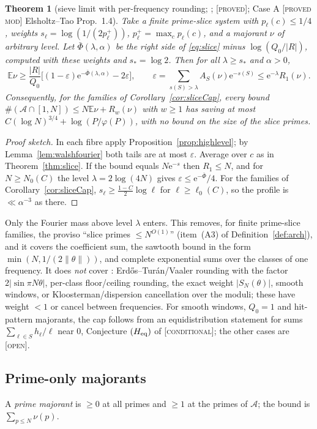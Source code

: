 \documentclass[10pt,reqno]{amsart}
\newtheorem{theorem}{Theorem}[section]
\theoremstyle{definition}
\theoremstyle{remark}
\newcommand{\A}{\mathcal A}
\newcommand{\E}{\mathbb E}
\newcommand{\e}{\mathrm e}
\newcommand{\lab}[1]{\textup{[\textsc{#1}]}}
\begin{document}
\begin{theorem}[sieve limit with per-frequency rounding; {\cite[Thm~2.3, Cors~2.4, 2.5]{NC}}; \lab{proved}; Case A \lab{proved mod} Elsholtz--Tao Prop.~1.4]\label{thm:perfreq}
Take a finite prime-slice system with $p_\ell(c)\leq1/4$, weights
$s_\ell=\log(1/(2p^+_\ell))$, $p^+_\ell=\max_cp_\ell(c)$, and a majorant $\nu$ of
arbitrary level.  Let $\bar\Phi(\lambda,\alpha)$ be the right side of
\eqref{eq:slice} minus $\log(Q_0/|R|)$, computed with these weights and
$s_*=\log2$.  Then for all $\lambda\geq s_*$ and $\alpha>0$,
\[
 \E\nu\geq\frac{|R|}{Q_0}\bigl[(1-\varepsilon)\e^{-\bar\Phi(\lambda,\alpha)}-2\varepsilon\bigr],\qquad
 \varepsilon=\sum_{s(S)>\lambda}A_S(\nu)\e^{-s(S)}\leq\e^{-\lambda}R_1(\nu).
\]
Consequently, for the families of Corollary~\ref{cor:sliceCap}, every
bound $\#(\A\cap[1,N])\leq N\E\nu+R_w(\nu)$ with $w\geq1$ has saving at most
$C(\log N)^{3/4}+\log(P/\varphi(P))$, with no bound on the size of the
slice primes.
\end{theorem}
\begin{proof}[Proof sketch]
In each fibre apply Proposition~\ref{prop:highlevel}; by
Lemma~\ref{lem:walshfourier} both tails are at most $\varepsilon$.  Average
over $c$ as in Theorem~\ref{thm:slice}.  If the bound equals $N\e^{-s}$ then
$R_1\leq N$, and for $N\geq N_0(C)$ the level $\lambda=2\log(4N)$ gives $\varepsilon\leq\e^{-\bar\Phi}/4$.  For
the families of Corollary~\ref{cor:sliceCap}, $s_\ell\geq\frac{1-C}2\log\ell$
for $\ell\geq\ell_0(C)$, so the profile is $\ll\alpha^{-3}$ as there.
\end{proof}
Only the Fourier mass above level $\lambda$ enters.  This removes, for
finite prime-slice families, the proviso ``slice primes $\leq N^{O(1)}$''
(item~(A3) of Definition~\ref{def:arch}), and it covers the coefficient sum,
the sawtooth bound in the form $\min(N,1/(2\|\theta\|))$, and complete
exponential sums over the classes of one frequency.  It does \emph{not}
cover \cite[\S\S2.3--2.5]{NC}: Erd\H{o}s--Tur\'an/Vaaler rounding with the
factor $2|\sin\pi N\theta|$, per-class floor/ceiling rounding, the exact
weight $|S_N(\theta)|$, smooth windows, or Kloosterman/dispersion
cancellation over the moduli; these have weight $<1$ or cancel between
frequencies.  For smooth windows, $Q_0=1$ and hit-pattern majorants,
the cap follows from an equidistribution statement for sums
$\sum_{\ell\in S}h_\ell/\ell$ near $0$, Conjecture $(H_{\rm eq})$ of
\cite[(2.6)]{NC} \lab{conditional}; the other cases are \lab{open}.

\subsection{Prime-only majorants}
A \emph{prime majorant} is $\geq0$ at all primes and $\geq1$ at the primes of
$\A$; the bound is $\sum_{p\leq N}\nu(p)$.
\end{document}
